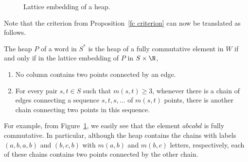  \begin{figure}[htb]\centering
 \centering

 \caption{Lattice embedding of a heap.}
 \label{fig:example}
 \end{figure}
 Note that the criterion from
 Proposition~\ref{fc criterion} can now be translated as follows.
 \begin{prop}
 \label{fc heap criterion}
 The heap $P$ of a word in $S^*$ is the heap of a fully
 commutative element in $W$ if and only if in the lattice embedding of
 $P$ in $S\times \N$,
 \begin{enumerate} 
 \item No column contains two points connected by an edge.
 \item For every pair $s,t\in S$ such that $m(s,t)\ge 3$, whenever there is a
 chain of edges connecting a sequence $s,t,s,\ldots $ of $m(s,t)$
 points, there is another chain connecting two points in this sequence.
 \end{enumerate} 
 \end{prop} 
 \noindent For example, from Figure~\ref{fig:example}, we easily see that
 the element $abcabd$ is fully commutative. In particular, although the
 heap contains the chains with labels $(a,b,a,b)$ and $(b,c,b)$ with $m(a,b)$ and $m(b,c)$ letters, respectively, each of these chains contains two points connected by the other chain. 

